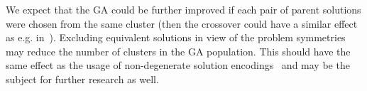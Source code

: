 \documentclass{ifacconf}
\begin{document}
We expect that the GA could be further improved if each pair of parent solutions were chosen from the same cluster (then the crossover
could have a similar effect as e.g. in~\cite{bib:Dang2016a}). Excluding equivalent solutions in view of the problem symmetries may 
reduce the number of clusters in the GA population.
This should have the same effect as the usage of non-degenerate solution encodings~\citep{ReevesDai} and may 
be the subject for further research as well. 

%
%
%
%

   
                                                  
\end{document}
